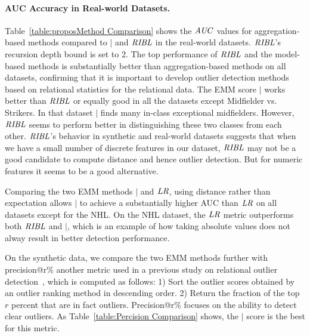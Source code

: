 {	\paragraph{AUC Accuracy in Real-world Datasets.}
Table~\ref{table:proposMethod Comparison} shows the $\it{AUC}$ values
 for aggregation-based methods compared to $\mid$ and $\it{RIBL}$ in the real-world datasets.  $\it{RIBL}$'s recursion depth bound is set to 2. The top performance of $\it{RIBL}$ and the model-based methods is substantially better than aggregation-based methods on all datasets,  confirming that it is important to develop outlier detection methods based on relational statistics for the relational data. The  EMM score $\mid$ works better than $\it{RIBL}$ or equally good in all the datasets except Midfielder vs. Strikers. In that dataset $\mid$ finds many in-class exceptional midfielders. However, $\it{RIBL}$ seems to perform better in distinguishing these two classes from each other. $\it{RIBL}$'s behavior in synthetic and real-world datasets suggests that when we have a small number of discrete features in our dataset, $\it{RIBL}$ may not be a good candidate to compute distance and hence outlier detection. But for numeric features it seems to be a good alternative.

Comparing the two EMM methods $\mid$ and $\it{LR}$, using distance rather than expectation allows $\mid$ to achieve a substantially higher AUC than $\it{LR}$ on all datasets except for the NHL. On the NHL dataset, the $\it{LR}$ metric outperforms both $\it{RIBL}$ and $\mid$, which is an example of how taking absolute values does not alway result in better detection performance.   

On the synthetic data, we compare the two EMM methods further  with precision@r\% another metric used in a previous study on relational outlier detection~\citep{Gao2010}, which is computed as follows: 1) Sort the outlier scores obtained by an outlier ranking method in descending order. 2) Return the fraction of the top $r$ percent that are in fact outliers. Precision@r\% focuses on the ability to detect clear outliers. As Table~\ref{table:Percision Comparison} shows, the $\mid$ score is the best for this metric.

	\begin{table}
		\begin{subtable}
			
			\centering
\end{subtable}
\end{table}}
